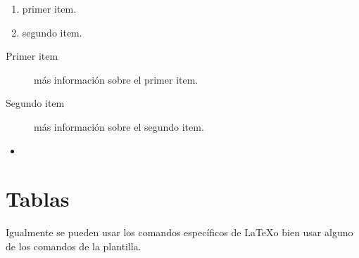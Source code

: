 \begin{enumerate}
	\item primer item.
	\item segundo item.
\end{enumerate}

\begin{description}
	\item[Primer item] más información sobre el primer item.
	\item[Segundo item] más información sobre el segundo item.
\end{description}
	
\begin{itemize}
\item 
\end{itemize}

\section{Tablas}

Igualmente se pueden usar los comandos específicos de \LaTeX o bien usar alguno de los comandos de la plantilla.


